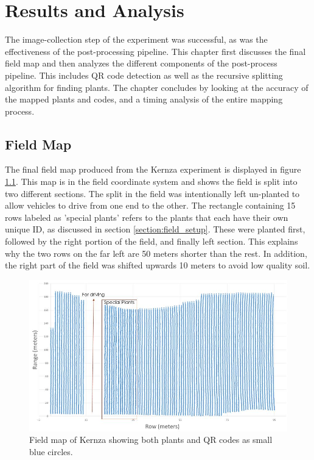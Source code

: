 
\cleardoublepage

\chapter{Results and Analysis}
\label{chapter:results}

The image-collection step of the experiment was successful, as was the effectiveness of the post-processing pipeline.  This chapter first discusses the final field map and then analyzes the different components of the post-process pipeline.  This includes QR code detection as well as the recursive splitting algorithm for finding plants.  The chapter concludes by looking at the accuracy of the mapped plants and codes, and a timing analysis of the entire mapping process.

\section{Field Map}

The final field map produced from the Kernza experiment is displayed in figure \ref{figure:field_map}.  This map is in the field coordinate system and shows the field is split into two different sections.  The split in the field was intentionally left un-planted to allow vehicles to drive from one end to the other.   The rectangle containing 15 rows labeled as 'special plants' refers to the plants that each have their own unique ID, as discussed in section \ref{section:field_setup}.  These were planted first, followed by the right portion of the field, and finally left section.  This explains why the two rows on the far left are 50 meters shorter than the rest. In addition, the right part of the field was shifted upwards 10 meters to avoid low quality soil.

\begin{figure}
	\centering
    \includegraphics[width=6in]{figures/field_map.jpg}
    \caption[Field map]{Field map of Kernza showing both plants and QR codes as small blue circles.}
    \label{figure:field_map}
\end{figure}

